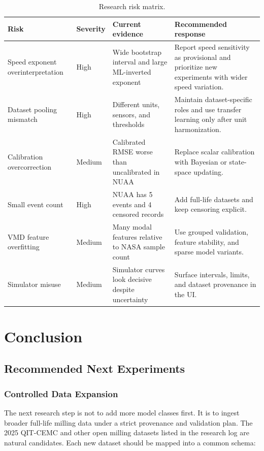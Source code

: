 \documentclass[11pt,a4paper]{article}
\begin{document}
\begin{table}[!htbp]
  \centering
  \caption{Research risk matrix.}
  \label{tab:risk-matrix}
  \small
  \begin{tabularx}{\textwidth}{p{3.0cm}p{2.0cm}p{2.0cm}Y}
    \toprule
    Risk & Severity & Current evidence & Recommended response \\
    \midrule
    Speed exponent overinterpretation & High & Wide bootstrap interval and large ML-inverted exponent & Report speed sensitivity as provisional and prioritize new experiments with wider speed variation. \\
    Dataset pooling mismatch & High & Different units, sensors, and thresholds & Maintain dataset-specific roles and use transfer learning only after unit harmonization. \\
    Calibration overcorrection & Medium & Calibrated RMSE worse than uncalibrated in NUAA & Replace scalar calibration with Bayesian or state-space updating. \\
    Small event count & High & NUAA has 5 events and 4 censored records & Add full-life datasets and keep censoring explicit. \\
    VMD feature overfitting & Medium & Many modal features relative to NASA sample count & Use grouped validation, feature stability, and sparse model variants. \\
    Simulator misuse & Medium & Simulator curves look decisive despite uncertainty & Surface intervals, limits, and dataset provenance in the UI. \\
    \bottomrule
  \end{tabularx}
\end{table}

\section{Conclusion}

\subsection{Recommended Next Experiments}

\subsubsection{Controlled Data Expansion}

The next research step is not to add more model classes first. It is to ingest broader full-life milling data under a strict provenance and validation plan. The 2025 QIT-CEMC and other open milling datasets listed in the research log are natural candidates. Each new dataset should be mapped into a common schema:
\end{document}
